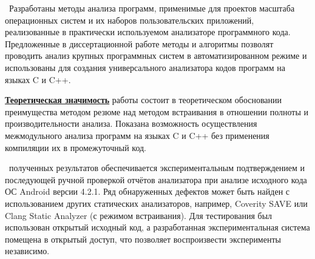 {\begin{enumerate}
\end{enumerate}

\influence\ Разработаны методы анализа программ, применимые для проектов масштаба операционных систем и их наборов пользовательских приложений, реализованные в практически используемом анализаторе программного кода. Предложенные в диссертационной работе методы и алгоритмы позволят  проводить анализ крупных программных систем в автоматизированном режиме и использованы для создания универсального анализатора кодов программ на языках C и C++.

\underline{\textbf{Теоретическая значимость}} работы состоит в теоретическом обосновании преимущества методом резюме над методом встраивания в отношении полноты и производительности анализа. Показана возможность осуществления межмодульного анализа программ на языках C и C++ без применения компиляции их в промежуточный код.

\reliability\ полученных результатов обеспечивается экспериментальным подтверждением и последующей ручной проверкой отчётов анализатора при анализе исходного кода ОС Android версии 4.2.1. Ряд обнаруженных дефектов может быть найден с использованием других статических анализаторов, например, Coverity SAVE или Clang Static Analyzer (с режимом встраивания). Для тестирования был использован открытый исходный код, а разработанная экспериментальная система помещена в открытый доступ, что позволяет воспроизвести эксперименты независимо.


}
